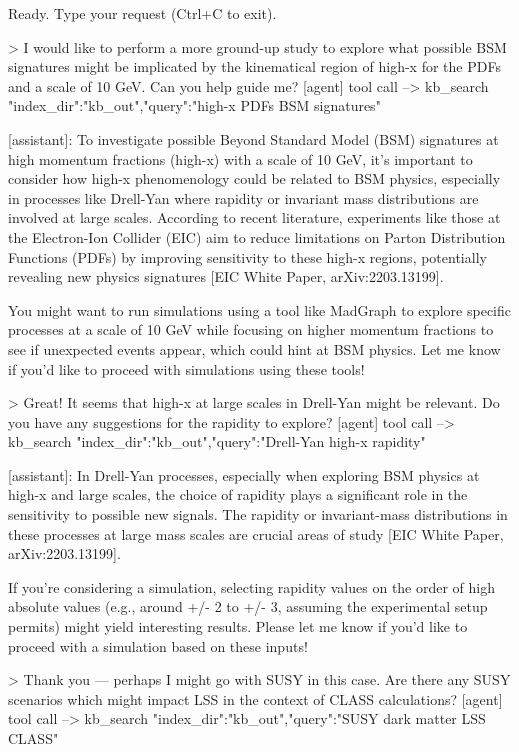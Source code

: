 \documentclass[final,3p,times,sort,compress]{elsarticle}
\begin{document}
\begin{terminalbox}
\begin{terminal}
	[ArgoLOOM] Ready. Type your request (Ctrl+C to exit).

> I would like to perform a more ground-up study to explore what possible BSM signatures might be implicated by the kinematical region of high-x for the PDFs and a scale of 10 GeV. Can you help guide me?
[agent] tool call --> kb_search {"index_dir":"kb_out","query":"high-x PDFs BSM signatures"}

[assistant]: To investigate possible Beyond Standard Model (BSM) signatures at high momentum fractions (high-x) with a scale of 10 GeV, it's important to consider how high-x phenomenology could be related to BSM physics, especially in processes like Drell-Yan where rapidity or invariant mass distributions are involved at large scales. According to recent literature, experiments like those at the Electron-Ion Collider (EIC) aim to reduce limitations on Parton Distribution Functions (PDFs) by improving sensitivity to these high-x regions, potentially revealing new physics signatures [EIC White Paper, arXiv:2203.13199].

You might want to run simulations using a tool like MadGraph to explore specific processes at a scale of 10 GeV while focusing on higher momentum fractions to see if unexpected events appear, which could hint at BSM physics. Let me know if you'd like to proceed with simulations using these tools!

> Great! It seems that high-x at large scales in Drell-Yan might be relevant. Do you have any suggestions for the rapidity to explore?
[agent] tool call --> kb\_search {"index\_dir":"kb\_out","query":"Drell-Yan high-x rapidity"}

[assistant]: In Drell-Yan processes, especially when exploring BSM physics at high-x and large scales, the choice of rapidity plays a significant role in the sensitivity to possible new signals. The rapidity or invariant-mass distributions in these processes at large mass scales are crucial areas of study [EIC White Paper, arXiv:2203.13199].

If you're considering a simulation, selecting rapidity values on the order of high absolute values (e.g., around +/- 2 to +/- 3, assuming the experimental setup permits) might yield interesting results. Please let me know if you'd like to proceed with a simulation based on these inputs! 

> Thank you --- perhaps I might go with SUSY in this case. Are there any SUSY scenarios which might impact LSS in the context of CLASS calculations?
[agent] tool call --> kb\_search {"index\_dir":"kb\_out","query":"SUSY dark matter LSS CLASS"}


\end{terminal}
\end{terminalbox}
\end{document}
